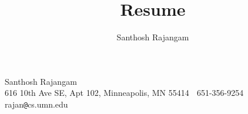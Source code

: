 \documentclass[10pt,a4paper]{article}
\author{Santhosh Rajangam}
\title{Resume}
\begin{document}
\begin{center}
{\Large Santhosh Rajangam} \\[.5pc]
616 10th Ave SE, Apt 102, Minneapolis, MN 55414 $\;$ 651-356-9254 $\;$ rajan\verb|@|cs.umn.edu $\;$ \\[5pc]
\end{center}
\end{document}
